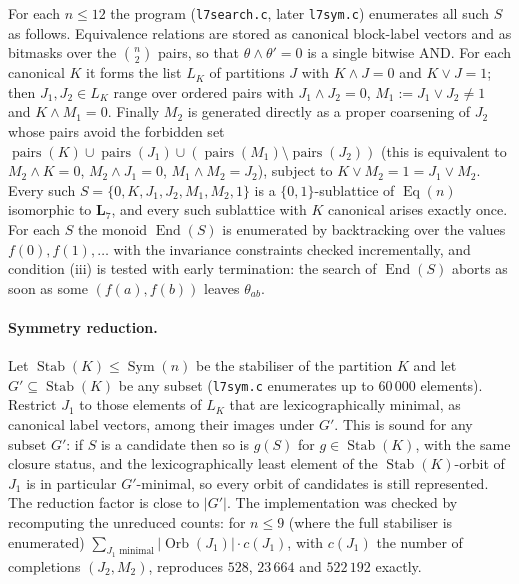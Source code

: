 \documentclass[11pt]{article}
\theoremstyle{remark}
\newcommand{\Eq}{\operatorname{Eq}}
\newcommand{\End}{\operatorname{End}}
\newcommand{\LL}{\mathbf{L}_7}
\begin{document}
For each $n\le 12$ the program (\texttt{l7search.c}, later \texttt{l7sym.c}) enumerates all such $S$ as follows.
Equivalence relations are stored as canonical block-label vectors and as bitmasks over the
$\binom n2$ pairs, so that $\theta\wedge\theta'=0$ is a single bitwise AND.
For each canonical $K$ it forms the list $L_K$ of partitions $J$ with $K\wedge J=0$ and $K\vee J=1$;
then $J_1,J_2\in L_K$ range over ordered pairs with $J_1\wedge J_2=0$, $M_1:=J_1\vee J_2\ne 1$ and
$K\wedge M_1=0$. Finally $M_2$ is generated directly as a proper coarsening of $J_2$ whose pairs
avoid the forbidden set $\operatorname{pairs}(K)\cup\operatorname{pairs}(J_1)\cup
(\operatorname{pairs}(M_1)\setminus\operatorname{pairs}(J_2))$
(this is equivalent to $M_2\wedge K=0$, $M_2\wedge J_1=0$, $M_1\wedge M_2=J_2$), subject to
$K\vee M_2=1=J_1\vee M_2$. Every such $S=\{0,K,J_1,J_2,M_1,M_2,1\}$ is a $\{0,1\}$-sublattice
of $\Eq(n)$ isomorphic to $\LL$, and every such sublattice with $K$ canonical arises exactly once.
For each $S$ the monoid $\End(S)$ is enumerated by backtracking over the values
$f(0),f(1),\dots$ with the invariance constraints checked incrementally, and condition (iii)
is tested with early termination: the search of $\End(S)$ aborts as soon as some
$(f(a),f(b))$ leaves $\theta_{ab}$.

\paragraph{Symmetry reduction.} Let $\operatorname{Stab}(K)\le\operatorname{Sym}(n)$ be the
stabiliser of the partition $K$ and let $G'\subseteq\operatorname{Stab}(K)$ be any subset
(\texttt{l7sym.c} enumerates up to $60\,000$ elements). Restrict $J_1$ to those elements of $L_K$
that are lexicographically minimal, as canonical label vectors, among their images under $G'$.
This is sound for any subset $G'$: if $S$ is a candidate then so is $g(S)$ for $g\in\operatorname{Stab}(K)$,
with the same closure status, and the lexicographically least element of the
$\operatorname{Stab}(K)$-orbit of $J_1$ is in particular $G'$-minimal, so every orbit of candidates
is still represented. The reduction factor is close to $|G'|$. The implementation was checked
by recomputing the unreduced counts: for $n\le 9$ (where the full stabiliser is enumerated)
$\sum_{J_1\text{ minimal}}|\operatorname{Orb}(J_1)|\cdot c(J_1)$, with $c(J_1)$ the number of
completions $(J_2,M_2)$, reproduces $528$, $23\,664$ and $522\,192$ exactly.
\end{document}
